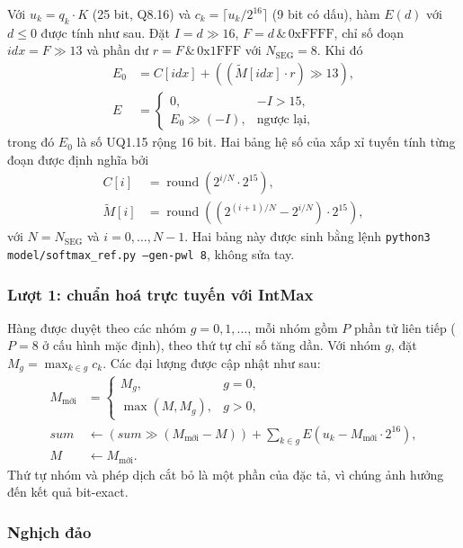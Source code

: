 Với $u_k = q_k \cdot K$ (25 bit, Q8.16) và $c_k = \lceil u_k / 2^{16} \rceil$ (9 bit có dấu), hàm $E(d)$ với $d \le 0$ được tính như sau. Đặt $I = d \gg 16$, $F = d \,\&\, \text{0xFFFF}$, chỉ số đoạn $\mathit{idx} = F \gg 13$ và phần dư $r = F \,\&\, \text{0x1FFF}$ với $N_{\text{SEG}} = 8$. Khi đó
\begin{align}
  E_0 &= C[\mathit{idx}] + \left((\tilde{M}[\mathit{idx}] \cdot r) \gg 13\right), \\
  E   &= \begin{cases} 0, & -I > 15, \\ E_0 \gg (-I), & \text{ngược lại,} \end{cases}
\end{align}
trong đó $E_0$ là số UQ1.15 rộng 16 bit. Hai bảng hệ số của xấp xỉ tuyến tính từng đoạn được định nghĩa bởi
\begin{align}
  C[i] &= \operatorname{round}\left(2^{i/N} \cdot 2^{15}\right), \\
  \tilde{M}[i] &= \operatorname{round}\left(\left(2^{(i+1)/N} - 2^{i/N}\right) \cdot 2^{15}\right),
\end{align}
với $N = N_{\text{SEG}}$ và $i = 0, \dots, N-1$. Hai bảng này được sinh bằng lệnh \texttt{python3 model/softmax\_ref.py --gen-pwl 8}, không sửa tay.

\subsubsection{Lượt 1: chuẩn hoá trực tuyến với IntMax}
\label{sec:pass1}

Hàng được duyệt theo các nhóm $g = 0, 1, \dots$, mỗi nhóm gồm $P$ phần tử liên tiếp ($P = 8$ ở cấu hình mặc định), theo thứ tự chỉ số tăng dần. Với nhóm $g$, đặt $M_g = \max_{k \in g} c_k$. Các đại lượng được cập nhật như sau:
\begin{align}
  M_{\text{mới}} &= \begin{cases} M_g, & g = 0, \\ \max(M, M_g), & g > 0, \end{cases} \\
  \mathit{sum} &\leftarrow \left(\mathit{sum} \gg (M_{\text{mới}} - M)\right) + \sum_{k \in g} E(u_k - M_{\text{mới}} \cdot 2^{16}), \\
  M &\leftarrow M_{\text{mới}}.
\end{align}
Thứ tự nhóm và phép dịch cắt bỏ là một phần của đặc tả, vì chúng ảnh hưởng đến kết quả bit-exact.

\subsubsection{Nghịch đảo}
\label{sec:rcp}

